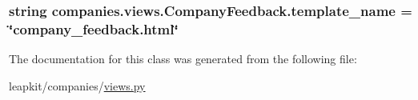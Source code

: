 \hypertarget{classcompanies_1_1views_1_1_company_feedback_a5d925acfbfa5fe69e9383be85adbd500}{
\subsubsection[{template\-\_\-name}]{\setlength{\rightskip}{0pt plus 5cm}string companies.\-views.\-Company\-Feedback.\-template\-\_\-name = \char`\"{}company\-\_\-feedback.\-html\char`\"{}\hspace{0.3cm}{\ttfamily [static]}}}\label{classcompanies_1_1views_1_1_company_feedback_a5d925acfbfa5fe69e9383be85adbd500}


The documentation for this class was generated from the following file\-:\begin{DoxyCompactItemize}
\item 
leapkit/companies/\hyperlink{companies_2views_8py}{views.\-py}\end{DoxyCompactItemize}
